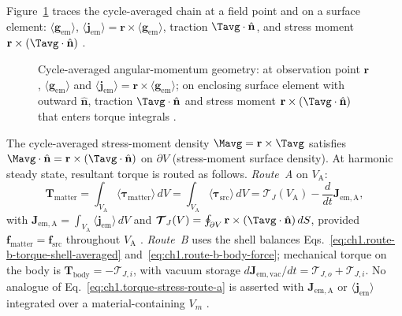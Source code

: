 Figure~\ref{fig:ch1.momentum-angular-geometry} traces the cycle-averaged chain at a field point and on a surface element: $\langle\mathbf{g}_{\mathrm{em}}\rangle$, $\langle\mathbf{j}_{\mathrm{em}}\rangle=\mathbf{r}\times\langle\mathbf{g}_{\mathrm{em}}\rangle$, traction $\Tavg\cdot\hat{\mathbf{n}}$, and stress moment $\mathbf{r}\times(\Tavg\cdot\hat{\mathbf{n}})$ \cite{maxwell1873,beth1936}.

\begin{figure}[t]
\centering
\VolIPhysFigWide{\VolIPhysMomentumAngularGeometry}
\caption{Cycle-averaged angular-momentum geometry: at observation point $\mathbf{r}$, $\langle\mathbf{g}_{\mathrm{em}}\rangle$ and $\langle\mathbf{j}_{\mathrm{em}}\rangle=\mathbf{r}\times\langle\mathbf{g}_{\mathrm{em}}\rangle$; on enclosing surface element with outward $\hat{\mathbf{n}}$, traction $\Tavg\cdot\hat{\mathbf{n}}$ and stress moment $\mathbf{r}\times(\Tavg\cdot\hat{\mathbf{n}})$ that enters torque integrals \cite{maxwell1873,beth1936,stratton1941}.}
\label{fig:ch1.momentum-angular-geometry}
\end{figure}

The cycle-averaged stress-moment density $\Mavg=\mathbf{r}\times\Tavg$ satisfies
$\Mavg\cdot\hat{\mathbf{n}}=\mathbf{r}\times(\Tavg\cdot\hat{\mathbf{n}})$ on $\partial V$ (stress-moment surface density).
At harmonic steady state, resultant torque is routed as follows. \emph{Route~A} on $V_{\mathrm{A}}$:
\begin{equation}
\label{eq:ch1.torque-stress-route-a}
\mathbf{T}_{\mathrm{matter}}
=\int_{V_{\mathrm{A}}}\langle\boldsymbol{\tau}_{\mathrm{matter}}\rangle\,dV
=\int_{V_{\mathrm{A}}}\langle\boldsymbol{\tau}_{\mathrm{src}}\rangle\,dV
=\boldsymbol{\mathcal{T}}_J(V_{\mathrm{A}})
-\frac{d}{dt}\mathbf{J}_{\mathrm{em,A}},
\end{equation}
with $\mathbf{J}_{\mathrm{em,A}}=\int_{V_{\mathrm{A}}}\langle\mathbf{j}_{\mathrm{em}}\rangle\,dV$ and $\boldsymbol{\mathcal{T}}_J(V)=\oint_{\partial V}\mathbf{r}\times(\Tavg\cdot\hat{\mathbf{n}})\,dS$, provided $\mathbf{f}_{\mathrm{matter}}=\mathbf{f}_{\mathrm{src}}$ throughout $V_{\mathrm{A}}$ \cite{beth1936,stratton1941}. \emph{Route~B} uses the shell balances Eqs.~\eqref{eq:ch1.route-b-torque-shell-averaged} and~\eqref{eq:ch1.route-b-body-force}; mechanical torque on the body is $\mathbf{T}_{\mathrm{body}}=-\boldsymbol{\mathcal{T}}_{J,i}$, with vacuum storage $d\mathbf{J}_{\mathrm{em,vac}}/dt=\boldsymbol{\mathcal{T}}_{J,o}+\boldsymbol{\mathcal{T}}_{J,i}$. No analogue of Eq.~\eqref{eq:ch1.torque-stress-route-a} is asserted with $\mathbf{J}_{\mathrm{em,A}}$ or $\langle\mathbf{j}_{\mathrm{em}}\rangle$ integrated over a material-containing $V_m$ \cite{harrington2001}.

